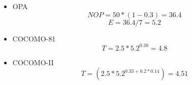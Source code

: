 \documentclass[a4paper,titlepage]{artikel1}
\begin{document}
\subsubsection[Opdracht 8]{}
\begin{itemize}
\item OPA
\begin{displaymath}
NOP=50*(1-0.3)=36.4
\end{displaymath} 
\begin{displaymath}
E=36.4/7=5.2
\end{displaymath}
\item COCOMO-81
\begin{displaymath}
T=2.5*5.2^{0.38}=4.8
\end{displaymath}
\item COCOMO-II
\begin{displaymath}
T=(2.5*5.2^{0.33+0.2*0.14})=4.51
\end{displaymath}
\end{itemize}
\end{document}
